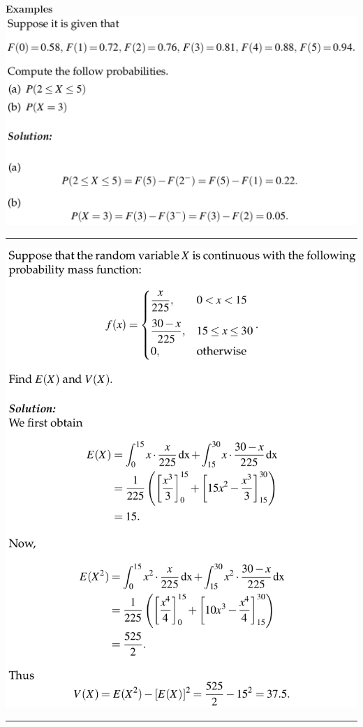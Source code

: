 \documentclass[a4paper, 12pt]{article}
\begin{document}
\begin{multicols*}{3}
{\small\textbf{Examples}} \\
\includegraphics[scale=0.25]{pmf-find-p.png}
\noindent\rule{\columnwidth}{0.5pt}
\includegraphics[scale=0.25]{pmf-e-v.png}
\noindent\rule{\columnwidth}{0.5pt}
%

\end{multicols*}
\end{document}

